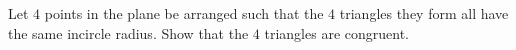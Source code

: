 Let $4$ points in the plane be arranged such that the $4$ triangles they
form all have the same incircle radius. Show that the $4$ triangles are congruent.